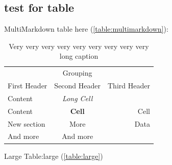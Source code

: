 \subsection{test for table}
\label{testfortable}

MultiMarkdown table here (\autoref{table:multimarkdown}): 

\begin{table}[htbp]
\begin{minipage}{\linewidth}
\setlength{\tymax}{0.5\linewidth}
\centering
\small
\caption{Very very very very very very very very very long caption}
\label{table:multimarkdown}
\begin{tabulary}{\textwidth}{@{}LCR@{}} \toprule
&Grouping&\\
First Header&Second Header&Third Header\\
\midrule
Content&\emph{Long Cell}&\\
Content&\textbf{Cell}&Cell\\

\midrule
New section&More&Data\\
And more&And more&\\

\bottomrule

\end{tabulary}
\end{minipage}
\end{table}

Large Table:large (\autoref{table:large})


